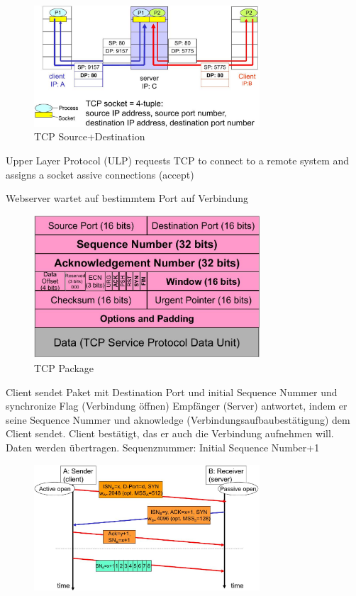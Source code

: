 \documentclass[ngerman,a4paper,12pt]{scrreprt}
\begin{document}
\begin{figure}[H]
	\centering
	\includegraphics[width=0.75\textwidth]{img/V11.10.jpg}
	\caption{TCP Source+Destination}
	\label{}
\end{figure}

Upper Layer Protocol (ULP) requests TCP to connect to
a remote system and assigns a socket
assive connections (accept)


Webserver wartet auf bestimmtem Port auf Verbindung

\begin{figure}[H]
	\centering
	\includegraphics[width=0.75\textwidth]{img/V11.11.jpg}
	\caption{TCP Package}
	\label{}
\end{figure}

\ol
	\li Client sendet Paket mit Destination Port und initial Sequence Nummer und synchronize Flag (Verbindung öffnen)
	\li Empfänger (Server) antwortet, indem er seine Sequence Nummer und aknowledge (Verbindungsaufbaubestätigung) dem Client sendet.
	\li Client bestätigt, das er auch die Verbindung aufnehmen will.
	\li Daten werden übertragen. Sequenznummer: Initial Sequence Number+1
\olE
\begin{figure}[H]
	\centering
	\includegraphics[width=0.75\textwidth]{img/V11.12.jpg}
	\caption{}
	\label{}
\end{figure}
\end{document}
